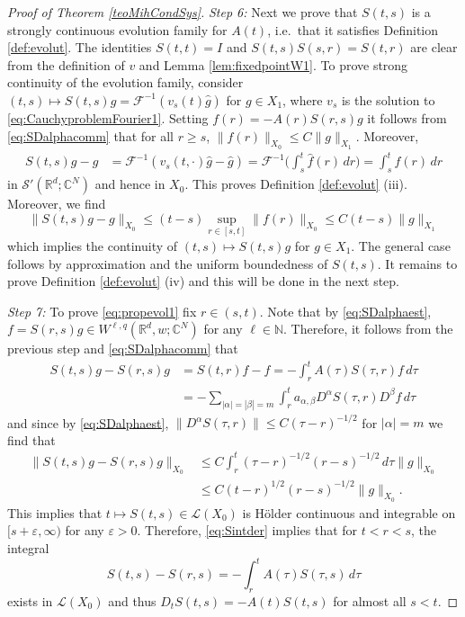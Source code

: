 \documentclass{amsart}
\theoremstyle{plain}
\theoremstyle{remark}
\theoremstyle{plain}
\numberwithin{equation}{section}
\begin{document}
\begin{proof}[Proof of Theorem \ref{teoMihCondSys}]
{\em  Step 6:} Next we prove that $S(t,s)$ is a strongly continuous evolution family for $A(t)$, i.e.\ that it satisfies Definition \ref{def:evolut}.
The identities $S(t,t) = I$ and $S(t,s)S(s,r) = S(t,r)$ are clear from the definition of $v$ and Lemma \ref{lem:fixedpointW1}. To prove strong continuity of the evolution family, consider $(t,s)\mapsto S(t,s)g = { \mathcal{F} }^{-1} (v_s(t)\hat{g})$ for $g\in X_1$, where $v_s$ is the solution to \eqref{eq:CauchyproblemFourier1}. Setting $f(r) = -A(r) S(r,s) g$ it follows from \eqref{eq:SDalphacomm} that for all $r\geq s$, $\|f(r)\|_{X_0}\leq C\|g\|_{X_1}$. Moreover,
\begin{align*}
S(t,s)g - g  & = { \mathcal{F} }^{-1}(v_s(t,\cdot)\hat{g} - \hat{g})   = { \mathcal{F} }^{-1} \Big(\int_s^t \hat{f}(r) \,dr \Big) = \int_s^t f(r) \,dr
\end{align*}
in ${{\mathscr S}}'({ \mathbb{R} }^d;{ \mathbb{C} }^N)$ and hence in $X_0$. This proves Definition \ref{def:evolut} (iii). Moreover, we find
\[\|S(t,s)g - g\|_{X_0}\leq (t-s) \sup_{r\in [s, t]}\|f(r)\|_{X_0}\leq C(t-s)\|g\|_{X_1}\]
which implies the continuity of $(t,s)\mapsto S(t,s)g$ for $g\in X_1$. The general case follows by approximation and the uniform boundedness of $S(t,s)$. It remains to prove Definition \ref{def:evolut} (iv) and this will be done in the next step.

{\em Step 7:} To prove \eqref{eq:propevol1} fix $r\in (s, t)$. Note that by \eqref{eq:SDalphaest}, $f = S(r,s)g\in W^{\ell, q}({ \mathbb{R} }^d,w;{ \mathbb{C} }^N)$ for any $\ell\in { \mathbb{N} }$. Therefore, it follows from the previous step and \eqref{eq:SDalphacomm} that
\begin{equation}\label{eq:Sintder}
\begin{aligned}
S(t,s) g - S(r,s) g & = S(t,r) f  - f  = -\int_r^t A(\tau) S(\tau,r) f \, d\tau \\ &= -\sum_{|\alpha| = |\beta|=m} \int_r^t a_{\alpha, \beta} D^{\alpha} S(\tau,r) D^{\beta} f \, d\tau
\end{aligned}
\end{equation}
and since by \eqref{eq:SDalphaest}, $\|D^{\alpha} S(\tau,r)\|\leq C(\tau-r)^{-1/2}$ for $|\alpha| = m$ we find that
\begin{align*}
\|S(t,s) g - S(r,s) g\|_{X_0}
& \leq C \int_r^t (\tau - r)^{-1/2} (r-s)^{-1/2} \, d\tau \|g\|_{X_0}
\\ & \leq C (t-r)^{1/2} (r-s)^{-1/2} \|g\|_{X_0}.
\end{align*}
This implies that $t\mapsto S(t,s)\in {{\mathscr L}}(X_0)$ is H\"older continuous and integrable on $[s+\varepsilon, \infty)$ for any $\varepsilon>0$.
Therefore, \eqref{eq:Sintder} implies that for $t<r<s$, the integral
\[S(t,s) - S(r,s) = -\int_r^t A(\tau) S(\tau,s)  \, d\tau\]
exists in ${{\mathscr L}}(X_0)$ and thus $D_t S(t,s) = -A(t) S(t,s)$ for almost all $s<t$.


\end{proof}
\end{document}
